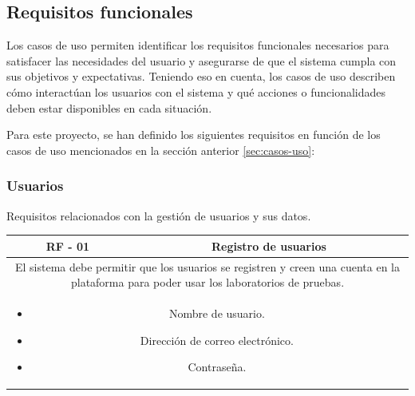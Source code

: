             \newpage
        
        \subsection{Requisitos funcionales}
            \label{sec:requisitos-funcionales}
            
            Los casos de uso permiten identificar los requisitos funcionales necesarios para satisfacer las necesidades del usuario y asegurarse de que el sistema cumpla con sus objetivos y expectativas. Teniendo eso en cuenta, los casos de uso describen cómo interactúan los usuarios con el sistema y qué acciones o funcionalidades deben estar disponibles en cada situación.
            
            Para este proyecto, se han definido los siguientes requisitos en función de los casos de uso mencionados en la sección anterior \ref{sec:casos-uso}:
            
            \subsubsection{Usuarios}
            
                Requisitos relacionados con la gestión de usuarios y sus datos.
                
                \begin{table}[!htbp]
                    \centering

                    \begin{tabular}{|c|c|}
                        \hline
                        \textbf{RF - 01} & \textbf{Registro de usuarios} \\
                        \hline
                        \multicolumn{2}{|p{15cm}|}{
                            El sistema debe permitir que los usuarios se registren y creen una cuenta en la plataforma para poder usar los laboratorios de pruebas.
                        } \\
                        \hline
                        \multicolumn{2}{|p{15cm}|}{
                            \begin{itemize}
                                \item Nombre de usuario.
                                \item Dirección de correo electrónico.
                                \item Contraseña.
                            \end{itemize}
                            } \\
                        \hline
                    \end{tabular}

                    \label{tab:RF1}
                \end{table}
                
